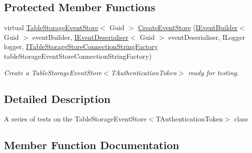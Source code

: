 \subsection*{Protected Member Functions}
\begin{DoxyCompactItemize}
\item 
virtual \hyperlink{classCqrs_1_1Azure_1_1BlobStorage_1_1Events_1_1TableStorageEventStore}{Table\+Storage\+Event\+Store}$<$ Guid $>$ \hyperlink{classCqrs_1_1Azure_1_1BlobStorage_1_1Test_1_1Integration_1_1TableStorageEventStoreTests_a287cbdff5908dd04c1924f359986d269_a287cbdff5908dd04c1924f359986d269}{Create\+Event\+Store} (\hyperlink{interfaceCqrs_1_1Events_1_1IEventBuilder}{I\+Event\+Builder}$<$ Guid $>$ event\+Builder, \hyperlink{interfaceCqrs_1_1Events_1_1IEventDeserialiser}{I\+Event\+Deserialiser}$<$ Guid $>$ event\+Deserialiser, I\+Logger logger, \hyperlink{interfaceCqrs_1_1Azure_1_1BlobStorage_1_1ITableStorageStoreConnectionStringFactory}{I\+Table\+Storage\+Store\+Connection\+String\+Factory} table\+Storage\+Event\+Store\+Connection\+String\+Factory)
\begin{DoxyCompactList}\small\item\em Create a Table\+Storage\+Event\+Store$<$\+T\+Authentication\+Token$>$ ready for testing. \end{DoxyCompactList}\end{DoxyCompactItemize}


\subsection{Detailed Description}
A series of tests on the Table\+Storage\+Event\+Store$<$\+T\+Authentication\+Token$>$ class 



\subsection{Member Function Documentation}
\mbox{\label{classCqrs_1_1Azure_1_1BlobStorage_1_1Test_1_1Integration_1_1TableStorageEventStoreTests_a287cbdff5908dd04c1924f359986d269_a287cbdff5908dd04c1924f359986d269}} 
